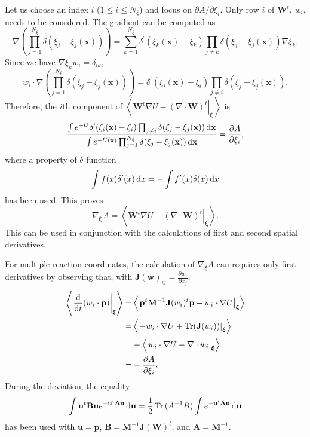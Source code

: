 Let us choose an index $i$ ($1\leq i\leq N_\xi$) and focus on $\partial A/\partial \xi_i$. Only row $i$ of $\mathbf{W}^t$, $w_i$, needs to be considered. The gradient can be computed as
\begin{equation}
    \nabla\left(\prod_{j=1}^{N_\xi}\delta(\xi_j-\xi_j(\mathbf{x}))\right)=\sum_{k=1}^{N_\xi}\delta^\prime(\xi_k(\mathbf{x})-\xi_k)\prod_{j\neq k}\delta(\xi_j-\xi_j(\mathbf{x}))\nabla \xi_k.
\end{equation}
Since we have $\nabla \xi_k w_i=\delta_{ik}$,
\begin{equation}
    w_i\cdot \nabla\left(\prod_{j=1}^{N_\xi}\delta(\xi_j-\xi_j(\mathbf{x}))\right)=\delta^\prime(\xi_i(\mathbf{x})-\xi_i)\prod_{j\neq i}\delta(\xi_j-\xi_j(\mathbf{x})).
\end{equation}
Therefore, the $i$th component of $\left<\left.\mathbf{W}^t\nabla U-(\nabla\cdot\mathbf{W})^t\right|_{\boldsymbol{\xi}}\right>$ is
\begin{equation}
    \frac{\int e^{-U}\delta^\prime(\xi_i(\mathbf{x})-\xi_i)\prod_{j\neq i}\delta(\xi_j-\xi_j(\mathbf{x}))\mathop{}\!\mathrm{d} \mathbf{x}}{\int e^{-U(\mathbf{x})}\prod_{j=1}^{N_\xi}\delta(\xi_j-\xi_j(\mathbf{x}))\mathop{}\!\mathrm{d} \mathbf{x}}=\frac{\partial A}{\partial \xi_i},
\end{equation}
where a property of $\delta$ function
\begin{equation}
   \int f(x)\delta^\prime(x)\mathop{}\!\mathrm{d} x=-\int f^\prime(x)\delta(x)\mathop{}\!\mathrm{d} x
\end{equation}
has been used. This proves
\begin{equation}
    \nabla_{\boldsymbol{\xi}}A=\left<\left.\mathbf{W}^t\nabla U-(\nabla\cdot\mathbf{W})^t\right|_{\boldsymbol{\xi}}\right>.
    \label{eq:FEM:ABF:ABFold}
\end{equation}
This can be used in conjunction with the calculations of first and second spatial derivatives. 

For multiple reaction coordinates, the calculation of $\nabla_\xi A$ can requires only first derivatives by observing that, with $\mathbf{J}(\mathbf{w})_{ij}=\frac{\partial w_i}{\partial x_j}$,
\begin{align}
    \left<\left.\frac{\mathop{}\!\mathrm{d} }{\mathop{}\!\mathrm{d} t}(w_i\cdot \mathbf{p})\right|_{\boldsymbol{\xi}}\right>=&\left<\left.\mathbf{p}^t\mathbf{M}^{-1}\mathbf{J}(w_i)^t\mathbf{p}-w_i\cdot \nabla U\right|_{\boldsymbol{\xi}}\right>\notag\\
    =&\left<\left.-w_i\cdot \nabla U+\operatorname{Tr}(\mathbf{J}(w_i))\right|_{\boldsymbol{\xi}}\right>\notag\\
    =&-\left<\left.w_i\cdot\nabla U-\nabla\cdot w_i\right|_{\boldsymbol{\xi}}\right>\notag\\
    =&-\frac{\partial A}{\partial \xi_i}.
\end{align}
During the deviation, the equality
\begin{equation}
    \int \mathbf{u}^t\mathbf{B}\mathbf{u}e^{-\mathbf{u}^t\mathbf{A}\mathbf{u}}\mathop{}\!\mathrm{d} \mathbf{u}=\frac{1}{2}\operatorname{Tr}{(A^{-1}B)}\int e^{-\mathbf{u}^{t}\mathbf{A}\mathbf{u}}\mathop{}\!\mathrm{d} \mathbf{u}
\end{equation}
has been used with $\mathbf{u}=\mathbf{p}$, $\mathbf{B}=\mathbf{M}^{-1}\mathbf{J}(\mathbf{W})^t$, and $\mathbf{A}=\mathbf{M}^{-1}$.

